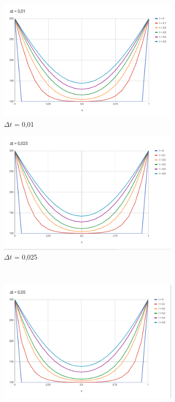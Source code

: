 \documentclass{article}
\begin{document}
        \begin{figure}[H]
            \centering
            \begin{subfigure}[b]{0.45\textwidth}
                \includegraphics[width=\textwidth]{las-1.png}
                \caption{$\Delta t$ = 0,01}
            \end{subfigure}
            \begin{subfigure}[b]{0.45\textwidth}
                \includegraphics[width=\textwidth]{las-2.png}
                \caption{$\Delta t$ = 0,025}
            \end{subfigure}
            \\
            \begin{subfigure}[b]{0.45\textwidth}
                \includegraphics[width=\textwidth]{las-3.png}

\end{subfigure}
\end{figure}
\end{document}
